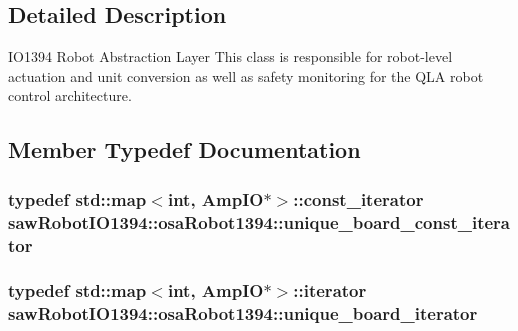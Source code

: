 \subsection{Detailed Description}
I\-O1394 Robot Abstraction Layer This class is responsible for robot-\/level actuation and unit conversion as well as safety monitoring for the Q\-L\-A robot control architecture. 

\subsection{Member Typedef Documentation}
\hypertarget{classsaw_robot_i_o1394_1_1osa_robot1394_a01f7b23037caa05ef8fceb96d032d451}{
\subsubsection[{unique\-\_\-board\-\_\-const\-\_\-iterator}]{\setlength{\rightskip}{0pt plus 5cm}typedef std\-::map$<$int, Amp\-I\-O$\ast$$>$\-::const\-\_\-iterator {\bf saw\-Robot\-I\-O1394\-::osa\-Robot1394\-::unique\-\_\-board\-\_\-const\-\_\-iterator}\hspace{0.3cm}{\ttfamily [protected]}}}\label{classsaw_robot_i_o1394_1_1osa_robot1394_a01f7b23037caa05ef8fceb96d032d451}
\hypertarget{classsaw_robot_i_o1394_1_1osa_robot1394_a978238551892ef80ceb59dfdaca46d9d}{
\subsubsection[{unique\-\_\-board\-\_\-iterator}]{\setlength{\rightskip}{0pt plus 5cm}typedef std\-::map$<$int, Amp\-I\-O$\ast$$>$\-::iterator {\bf saw\-Robot\-I\-O1394\-::osa\-Robot1394\-::unique\-\_\-board\-\_\-iterator}\hspace{0.3cm}{\ttfamily [protected]}}}\label{classsaw_robot_i_o1394_1_1osa_robot1394_a978238551892ef80ceb59dfdaca46d9d}


